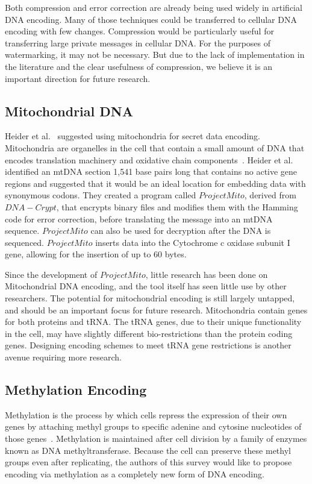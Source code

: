 \documentclass{bioinfo}
\begin{document}
Both compression and error correction are already being used widely in artificial DNA encoding. Many of those techniques could be transferred to cellular DNA encoding with few changes. Compression would be particularly useful for transferring large private messages in cellular DNA. For the purposes of watermarking, it may not be necessary. But due to the lack of implementation in the literature and the clear usefulness of compression, we believe it is an important direction for future research.

\subsection{Mitochondrial DNA}

Heider et al.~\cite{HKB2008B} suggested using mitochondria for secret data encoding. Mitochondria are organelles in the cell that contain a small amount of DNA that encodes translation machinery and oxidative chain components~\cite{GV2001G}. Heider et al. identified an mtDNA section 1,541 base pairs long that contains no active gene regions and suggested that it would be an ideal location for embedding data with synonymous codons. They created a program called $Project Mito$, derived from $DNA-Crypt$, that encrypts binary files and modifies them with the Hamming code for error correction, before translating the message into an mtDNA sequence. $Project Mito$ can also be used for decryption after the DNA is sequenced. $Project Mito$ inserts data into the Cytochrome c oxidase subunit I gene, allowing for the insertion of up to 60 bytes.

Since the development of $Project Mito$, little research has been done on Mitochondrial DNA encoding, and the tool itself has seen little use by other researchers. The potential for mitochondrial encoding is still largely untapped, and should be an important focus for future research. Mitochondria contain genes for both proteins and tRNA. The tRNA genes, due to their unique functionality in the cell, may have slightly different bio-restrictions than the protein coding genes. Designing encoding schemes to meet tRNA gene restrictions is another avenue requiring more research.

\subsection{Methylation Encoding}

Methylation is the process by which cells repress the expression of their own genes by attaching methyl groups to specific adenine and cytosine nucleotides of those genes~\cite{RRBW2006B}. Methylation is maintained after cell division by a family of enzymes known as DNA methyltransferase. Because the cell can preserve these methyl groups even after replicating, the authors of this survey would like to propose encoding via methylation as a completely new form of DNA encoding.
\end{document}
